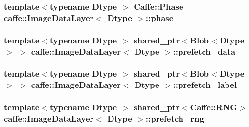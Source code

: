 \hypertarget{classcaffe_1_1_image_data_layer_ad16bb1500ecf69e5891f53794f565681}{
\subsubsection[{phase\+\_\+}]{\setlength{\rightskip}{0pt plus 5cm}template$<$typename Dtype $>$ {\bf Caffe\+::\+Phase} {\bf caffe\+::\+Image\+Data\+Layer}$<$ Dtype $>$\+::phase\+\_\+\hspace{0.3cm}{\ttfamily [protected]}}}\label{classcaffe_1_1_image_data_layer_ad16bb1500ecf69e5891f53794f565681}
\hypertarget{classcaffe_1_1_image_data_layer_a5fdda88b05ef9bdf536544e5eb6931db}{
\subsubsection[{prefetch\+\_\+data\+\_\+}]{\setlength{\rightskip}{0pt plus 5cm}template$<$typename Dtype $>$ shared\+\_\+ptr$<${\bf Blob}$<$Dtype$>$ $>$ {\bf caffe\+::\+Image\+Data\+Layer}$<$ Dtype $>$\+::prefetch\+\_\+data\+\_\+\hspace{0.3cm}{\ttfamily [protected]}}}\label{classcaffe_1_1_image_data_layer_a5fdda88b05ef9bdf536544e5eb6931db}
\hypertarget{classcaffe_1_1_image_data_layer_ab762b1b1fb4cfb2e8029eed41cb0ec03}{
\subsubsection[{prefetch\+\_\+label\+\_\+}]{\setlength{\rightskip}{0pt plus 5cm}template$<$typename Dtype $>$ shared\+\_\+ptr$<${\bf Blob}$<$Dtype$>$ $>$ {\bf caffe\+::\+Image\+Data\+Layer}$<$ Dtype $>$\+::prefetch\+\_\+label\+\_\+\hspace{0.3cm}{\ttfamily [protected]}}}\label{classcaffe_1_1_image_data_layer_ab762b1b1fb4cfb2e8029eed41cb0ec03}
\hypertarget{classcaffe_1_1_image_data_layer_a57a7df530e562fa080923aab6c331ab9}{
\subsubsection[{prefetch\+\_\+rng\+\_\+}]{\setlength{\rightskip}{0pt plus 5cm}template$<$typename Dtype $>$ shared\+\_\+ptr$<${\bf Caffe\+::\+R\+N\+G}$>$ {\bf caffe\+::\+Image\+Data\+Layer}$<$ Dtype $>$\+::prefetch\+\_\+rng\+\_\+\hspace{0.3cm}{\ttfamily [protected]}}}\label{classcaffe_1_1_image_data_layer_a57a7df530e562fa080923aab6c331ab9}
